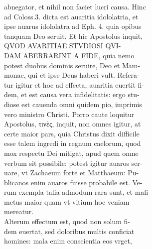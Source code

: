 \documentclass{article}
\begin{document}
\begin{pages}
                abnegator, et nihil non faciet lucri causa. Hinc \\
                ad Coloss.3. dicta est auaritia idololatria, et \\
                ipse auarus idololatra ad Eph. 4. quia opibus \\
                tanquam Deo seruit. Et hic Apostolus inquit, \\
                QVOD AVARITIAE STVDIOSI QVI- \\
                DAM ABERRARINT A FIDE, quia nemo \\
                potest duobus dominis seruire, Deo et Mam- \\
                monae, qui et ipse Deus haberi vult. Refera- \\
                tur igitur et hoc ad effecta, auaritia euertit fi- \\
                dem, et est causa vera infidelitatis: ergo stu- \\
                diose est cauenda omni quidem pio, imprimis \\
                vero ministro Christi. Porro caute loquitur \\
                Apostolus, τινὲς, inquit, non omnes igitur, at \\
                certe maior pars, quia Christus dixit difficile \\
                esse talem ingredi in regnum caelorum, quod \\
                mox respectu Dei mitigat, apud quem omne \\
                verbum sit possibile: potest igitur auaros ser- \\
                uare, vt Zachaeum forte et Matthaeum: Pu- \\
                blicanos enim auaros fuisse probabile est. Ve- \\
                rum exempla talia admodum rara sunt, et mali \\
                metus maior quam vt vitium hoc veniam \\
                mereatur. \\
                Alterum effectum est, quod non solum fi- \\
                dem euertat, sed doloribus multis conficiat \\
                homines: mala enim conscientia eos vrget, \\

\end{pages}
\end{document}
